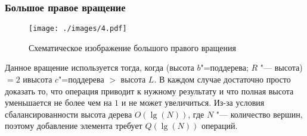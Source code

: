 \begin{frame}
    \frametitle{Большое правое вращение}

    \begin{figure}[ht]
        \texttt{[image: ./images/4.pdf]}
        
        \caption{Схематическое изображение большого правого вращения}

    \end{figure}

    Данное вращение используется тогда, когда (высота $b$"=поддерева; $R$ "--- высота)
    $= 2$ ивысота $c$"=поддерева $ > $ высота $L$.
    В каждом случае достаточно просто доказать то, 
    что операция приводит к нужному результату и
    что полная высота уменьшается не более чем на $1$ и не может увеличиться.
    Из-за условия сбалансированности высота дерева $O(\lg(N))$,
    где $N$ "--- количество вершин, поэтому добавление элемента требует $Q(\lg(N))$ операций.
\end{frame}